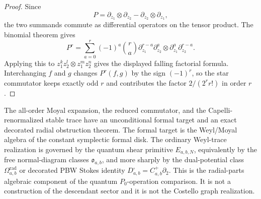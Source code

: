 \documentclass[11pt]{memoir}
\begin{document}
\begin{proof}
  Since
  $$P=\partial_{z_1}\otimes\partial_{z_2}
    -\partial_{z_2}\otimes\partial_{z_1},$$
  the two summands commute as differential operators on the tensor product.
  The binomial theorem gives
  $$P^r=\sum_{a=0}^r(-1)^a\binom{r}{a}
    \partial_{z_1}^{r-a}\partial_{z_2}^{a}
    \otimes
    \partial_{z_1}^{a}\partial_{z_2}^{r-a}.$$
  Applying this to $z_1^kz_2^l\otimes z_1^mz_2^n$ gives the displayed falling
  factorial formula. Interchanging $f$ and $g$ changes $P^r(f,g)$ by the sign
  $(-1)^r$, so the star commutator keeps exactly odd $r$ and contributes the
  factor $2/(2^r r!)$ in order $r$.
\end{proof}

The all-order Moyal expansion, the reduced commutator, and the
Capelli-renormalized stable trace have an unconditional formal target
and an exact decorated radial obstruction theorem.  The formal target is the
Weyl/Moyal algebra of the constant symplectic formal disk.  The ordinary
Weyl-trace realization is governed by the quantum shear primitive
\(E_{a,b,N}\), equivalently by the free normal-diagram classes
\(\mathfrak o_{a,b}\), and more sharply by the dual-potential class
\(\Omega^{\mathrm{rad}}_{a,b}\) or decorated PBW Stokes identity
\(D^\square_{a,b}=C^+_{a,b}\partial_2\).  This is the radial-parts
algebraic component of the quantum \(P_0\)-operation comparison. It is
not a construction of the descendant sector and it is not the Costello
graph realization.
\end{document}
